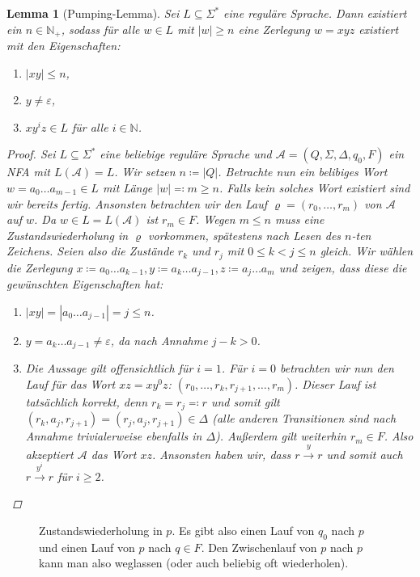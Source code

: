 \documentclass[11pt, a4paper]{article}
\theoremstyle{definition}
\theoremstyle{plain}
\newtheorem{lemma}[definition]{Lemma}
\numberwithin{equation}{section}
\newcommand{\reaches}[1]{\overset{#1}{\rightarrow}}
\begin{document}
\begin{lemma}[Pumping-Lemma]
	Sei $L \subseteq \Sigma^\ast$ eine reguläre Sprache. Dann existiert ein $n \in \mathbb{N}_+$, sodass für alle $w \in L$ mit $|w| \geq n$ eine Zerlegung $w = xyz$ existiert mit den Eigenschaften:
	\begin{enumerate}
		\item $|xy| \leq n$,
		\item $y \neq \varepsilon$,
		\item $xy^iz \in L$ für alle $i \in \mathbb{N}$. 
	\end{enumerate}
	\begin{proof}
		Sei $L \subseteq \Sigma^\ast$ eine beliebige reguläre Sprache und $\mathcal{A} = (Q, \Sigma, \Delta, q_0, F)$ ein NFA mit $L(\mathcal{A}) = L$. Wir setzen $n \coloneqq |Q|$. Betrachte nun ein belibiges Wort $w = a_0 \ldots a_{m-1} \in L$ mit Länge $|w| \eqqcolon m \geq n$. Falls kein solches Wort existiert sind wir bereits fertig. Ansonsten betrachten wir den Lauf $\varrho = (r_0, \ldots, r_m)$ von $\mathcal{A}$ auf $w$. Da $w \in L = L(\mathcal{A})$ ist $r_m \in F$. Wegen $m \leq n$ muss eine Zustandswiederholung in $\varrho$ vorkommen, spätestens nach Lesen des $n$-ten Zeichens. Seien also die Zustände $r_k$ und $r_j$ mit $0 \leq k < j \leq n$ gleich. Wir wählen die Zerlegung $x \coloneqq a_0 \ldots a_{k-1}, y \coloneqq a_k \ldots a_{j-1}, z \coloneqq a_j \ldots a_m$ und zeigen, dass diese die gewünschten Eigenschaften hat:
		\begin{enumerate}
			\item $|xy| = |a_0 \ldots a_{j-1}| = j \leq n$. \checkmark
			\item $y = a_k \ldots a_{j-1} \neq \varepsilon$, da nach Annahme $j-k > 0$. \checkmark
			\item Die Aussage gilt offensichtlich für $i = 1$. Für $i = 0$ betrachten wir nun den Lauf für das Wort $xz = xy^0z$: $(r_0, \ldots, r_k, r_{j+1}, \ldots, r_m)$. Dieser Lauf ist tatsächlich korrekt, denn $r_k = r_j \eqqcolon r$ und somit gilt $(r_k, a_j, r_{j+1}) = (r_j, a_j, r_{j+1}) \in \Delta$ (alle anderen Transitionen sind nach Annahme trivialerweise ebenfalls in $\Delta$). Außerdem gilt weiterhin $r_m \in F$. Also akzeptiert $\mathcal{A}$ das Wort $xz$. Ansonsten haben wir, dass $r \reaches{y} r$ und somit auch $r \reaches{y^i} r$ für $i \geq 2$.\checkmark \qedhere
		\end{enumerate}
	\end{proof}
\end{lemma}
\begin{figure}
	\centering
	
	\caption{Zustandswiederholung in $p$. Es gibt also einen Lauf von $q_0$ nach $p$ und einen Lauf von $p$ nach $q \in F$. Den Zwischenlauf von $p$ nach $p$ kann man also weglassen (oder auch beliebig oft wiederholen).}
	\label{fig:pumping}
\end{figure}
\end{document}

